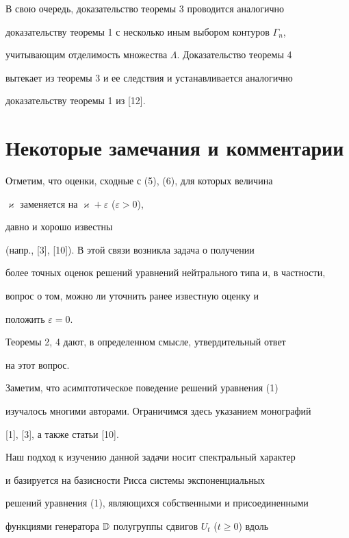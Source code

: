  


В свою очередь, доказательство теоремы 3 проводится аналогично 


доказательству теоремы 1 с несколько иным выбором контуров $\Gamma_n$, 


учитывающим отделимость множества $\Lambda$. Доказательство теоремы 4 


вытекает из теоремы 3 и ее следствия и устанавливается аналогично 


доказательству теоремы 1 из [12]. 


 


\section{Некоторые замечания и комментарии} 


 


Отметим, что оценки, сходные с (5), (6), для которых величина 


$\varkappa$ заменяется на $\varkappa+\varepsilon$ ($\varepsilon>0$), 


давно и хорошо известны 


(напр., [3], [10]). В этой связи возникла задача о получении


более точных оценок решений уравнений нейтрального типа и, в частности, 


вопрос о том, можно ли уточнить ранее известную оценку и 


положить $\varepsilon=0$. 


Теоремы 2, 4 дают, в определенном смысле, утвердительный ответ 


на этот вопрос. 


 


Заметим, что асимптотическое поведение решений уравнения (1) 


изучалось многими авторами. Ограничимся здесь указанием монографий 


[1], [3], а также статьи [10]. 


Наш подход к изучению данной задачи носит спектральный характер 


и базируется на базисности Рисса системы экспоненциальных 


решений уравнения (1), являющихся собственными и присоединенными 


функциями генератора $\Bbb D$ полугруппы сдвигов $U_t$ ($t\ge0$) вдоль 


